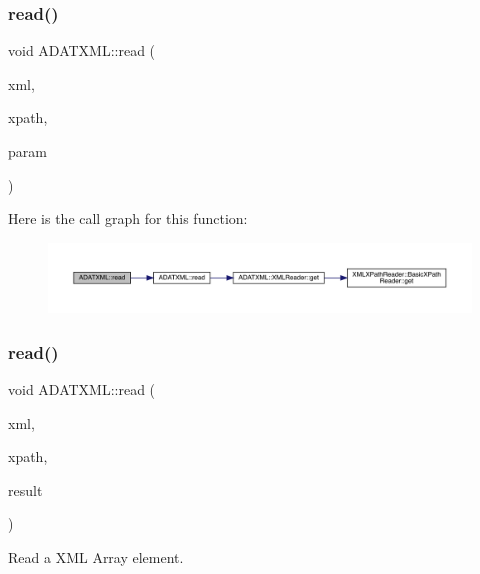 \subsubsection{\texorpdfstring{read()}{read()}\hspace{0.1cm}{\footnotesize\ttfamily [12/52]}}
{\footnotesize\ttfamily void A\+D\+A\+T\+X\+M\+L\+::read (\begin{DoxyParamCaption}\item[{\mbox{\hyperlink{classADATXML_1_1XMLReader}{X\+M\+L\+Reader}} \&}]{xml,  }\item[{const std\+::string \&}]{xpath,  }\item[{std\+::complex$<$ double $>$ \&}]{param }\end{DoxyParamCaption})}

Here is the call graph for this function\+:\nopagebreak
\begin{figure}[H]
\begin{center}
\leavevmode
\includegraphics[width=350pt]{d2/da3/group__io_gaf79f2861a8d55a3e88311959e646b0e1_cgraph}
\end{center}
\end{figure}
\mbox{\label{group__io_gaeaed8077b8bee4f4277ea0cc8cc13744}} 
\subsubsection{\texorpdfstring{read()}{read()}\hspace{0.1cm}{\footnotesize\ttfamily [13/52]}}
{\footnotesize\ttfamily void A\+D\+A\+T\+X\+M\+L\+::read (\begin{DoxyParamCaption}\item[{\mbox{\hyperlink{classADATXML_1_1XMLReader}{X\+M\+L\+Reader}} \&}]{xml,  }\item[{const std\+::string \&}]{xpath,  }\item[{\mbox{\hyperlink{classXMLArray_1_1Array}{Array}}$<$ int $>$ \&}]{result }\end{DoxyParamCaption})}



Read a X\+ML Array element. 

\mbox{\label{group__io_ga2eaf76c05e59884bd34813884eef708b}} 
